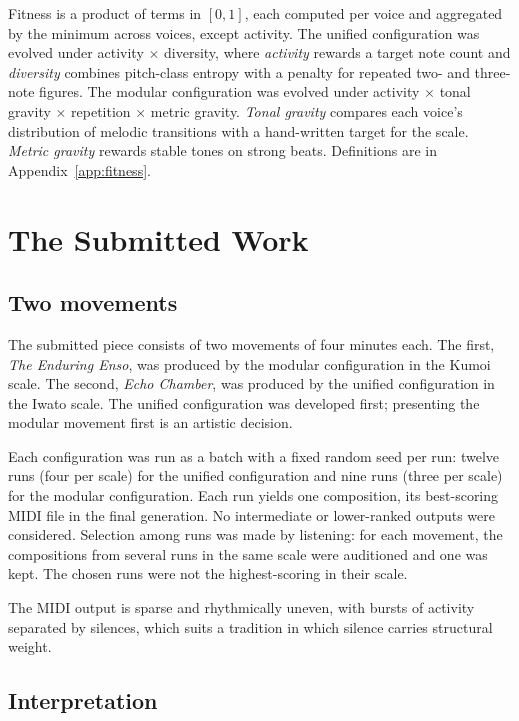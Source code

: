 \documentclass[conference]{IEEEtran}
\begin{document}
Fitness is a product of terms in $[0,1]$, each computed per voice and aggregated by the minimum across voices, except activity. The unified configuration was evolved under activity $\times$ diversity, where \emph{activity} rewards a target note count and \emph{diversity} combines pitch-class entropy with a penalty for repeated two- and three-note figures. The modular configuration was evolved under activity $\times$ tonal gravity $\times$ repetition $\times$ metric gravity. \emph{Tonal gravity} compares each voice's distribution of melodic transitions with a hand-written target for the scale. \emph{Metric gravity} rewards stable tones on strong beats. Definitions are in Appendix~\ref{app:fitness}.

\section{The Submitted Work}

\subsection{Two movements}

The submitted piece consists of two movements of four minutes each. The first, \emph{The Enduring Enso}, was produced by the modular configuration in the Kumoi scale. The second, \emph{Echo Chamber}, was produced by the unified configuration in the Iwato scale. The unified configuration was developed first; presenting the modular movement first is an artistic decision.

Each configuration was run as a batch with a fixed random seed per run: twelve runs (four per scale) for the unified configuration and nine runs (three per scale) for the modular configuration. Each run yields one composition, its best-scoring MIDI file in the final generation. No intermediate or lower-ranked outputs were considered. Selection among runs was made by listening: for each movement, the compositions from several runs in the same scale were auditioned and one was kept. The chosen runs were not the highest-scoring in their scale.

The MIDI output is sparse and rhythmically uneven, with bursts of activity separated by silences, which suits a tradition in which silence carries structural weight.

\subsection{Interpretation}
\end{document}
